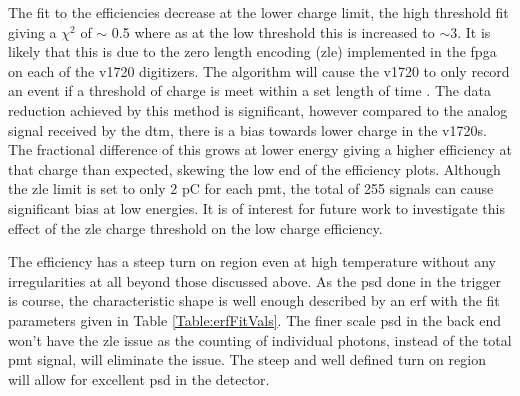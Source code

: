 The fit to the efficiencies decrease at the lower charge limit, the high threshold fit giving a $\chi^2$ of $\sim$ 0.5 where as at the low threshold this is increased to $\sim$3. It is likely that this is due to the zero length encoding (\gls{zle}) implemented in the \gls{fpga} on each of the \gls{v1720} digitizers. The algorithm will cause the \gls{v1720} to only record an event if a threshold of charge is meet within a set length of time \cite{deapTriggerLetter}. The data reduction achieved by this method is significant, however compared to the analog signal received by the \gls{dtm}, there is a bias towards lower charge in the \gls{v1720}s. The fractional difference of this grows at lower energy giving a higher efficiency at that charge than expected, skewing the low end of the efficiency plots. Although the \gls{zle} limit is set to only 2 pC for each \gls{pmt}, the total of 255 signals can cause significant bias at low energies. It is of interest for future work to investigate this effect of the \gls{zle} charge threshold on the low charge efficiency.

The efficiency has a steep turn on region even at high temperature without any irregularities at all beyond those discussed above. As the \gls{psd} done in the trigger is course, the characteristic shape is well enough described by an \gls{erf} with the fit parameters given in Table \ref{Table:erfFitVals}. The finer scale \gls{psd} in the back end won't have the \gls{zle} issue as the counting of individual photons, instead of the total \gls{pmt} signal, will eliminate the issue. The steep and well defined turn on region will allow for excellent \gls{psd} in the detector.